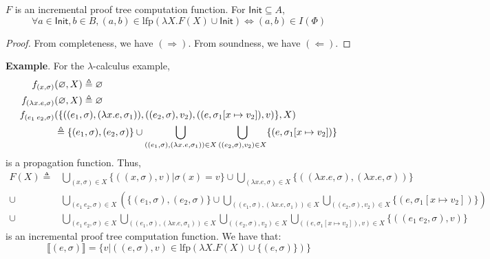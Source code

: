 \documentclass[12pt]{article}
\begin{document}
\begin{corollary}
	$F$ is an incremental proof tree computation function.
  For $\mathsf{Init}\subseteq A$,
  \[\forall a\in\mathsf{Init}, b\in B, (a,b)\in\text{lfp}(\lambda X.F(X)\cup\mathsf{Init})\Leftrightarrow (a,b)\in I(\Phi)\]
\end{corollary}
\begin{proof}
	From completeness, we have $(\Rightarrow)$. From soundness, we have $(\Leftarrow)$.
\end{proof}
\noindent\textbf{Example}. For the $\lambda$-calculus example,
\begin{align*}
	f_{(x,\sigma)}           & (\varnothing,X)\triangleq\varnothing                                                                                                                           \\
	f_{(\lambda x.e,\sigma)} & (\varnothing,X)\triangleq\varnothing                                                                                                                           \\
	f_{(e_1\:e_2,\sigma)}    & (\{((e_1,\sigma),(\lambda x.e,\sigma_1)),((e_2,\sigma),v_2),((e,\sigma_1[x\mapsto v_2]),v)\},X)                                                            \\
	                         & \triangleq\{(e_1,\sigma),(e_2,\sigma)\}\cup\bigcup_{((e_1,\sigma),(\lambda x.e,\sigma_1))\in X}\bigcup_{((e_2,\sigma),v_2)\in X}\{(e,\sigma_1[x\mapsto v_2])\}
\end{align*}
is a propagation function. Thus,
\begin{align*}
	F(X)\triangleq & \bigcup_{(x,\sigma)\in X}\{((x,\sigma),v)|\sigma(x)=v\}\cup\bigcup_{(\lambda x.e,\sigma)\in X}\{((\lambda x.e,\sigma),(\lambda x.e,\sigma))\}                                                     \\
	\cup           & \bigcup_{(e_1\:e_2,\sigma)\in X}\left(\{(e_1,\sigma),(e_2,\sigma)\}\cup\bigcup_{((e_1,\sigma),(\lambda x.e,\sigma_1))\in X}\bigcup_{((e_2,\sigma),v_2)\in X}\{(e,\sigma_1[x\mapsto v_2])\}\right) \\
	\cup           & \bigcup_{(e_1\:e_2,\sigma)\in X}\bigcup_{((e_1,\sigma),(\lambda x.e,\sigma_1))\in X}\bigcup_{((e_2,\sigma),v_2)\in X}\bigcup_{((e,\sigma_1[x\mapsto v_2]),v)\in X}\{((e_1\:e_2,\sigma),v)\}
\end{align*}
is an incremental proof tree computation function. We have that:
\[\lBrack(e,\sigma)\rBrack=\{v|((e,\sigma),v)\in\text{lfp}(\lambda X.F(X)\cup\{(e,\sigma)\})\}\]


\nocite{*}
\end{document}
